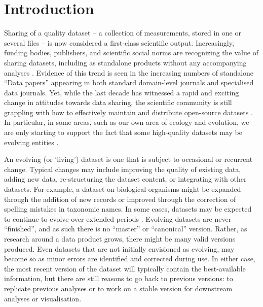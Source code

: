 \documentclass[a4paper,num-refs]{assets/oup-contemporary}
\begin{document}
\newcommand{\smurl}[1]{\href{https://#1}{#1}}
\newcommand{\ghsmurl}[1]{\href{https://github.com/#1}{#1}}

\section{Introduction}

Sharing of a quality dataset -- a collection of measurements, stored in one or several files -- is now considered a first-class scientific output. Increasingly, funding bodies, publishers, and scientific social norms are recognizing the value of sharing datasets, including as standalone products without any accompanying analyses \cite{Whitlock-2011,Fairbairn-2011,Piwowar-2011,VanNoorden-2013,Gibney-2013}. Evidence of this trend is seen in the increasing numbers of standalone ``Data papers'' appearing in both standard domain-level journals and specialised data journals. Yet, while the last decade has witnessed a rapid and exciting change in attitudes towards data sharing, the scientific community is still grappling with how to effectively maintain and distribute open-source datasets \cite{Whitlock-2011, Goodman-2014, Force11-2014, Lowndes-2017, Perkel-2016, VanNoorden-2013, Kratz-2015,Wilkinson-2016, Yenni-2018}. In particular, in some areas, such as our own area of ecology and evolution, we are only starting to support the fact that some high-quality datasets may be evolving entities \cite{Yenni-2018}.

An evolving (or `living') dataset is one that is subject to occasional or recurrent change. Typical changes may include improving the quality of existing data, adding new data, re-structuring the dataset content, or integrating with other datasets. For example, a dataset on biological organisms might be expanded through the addition of new records or improved through the correction of spelling mistakes in taxonomic names. In some cases, datasets may be expected to continue to evolve over extended periods \cite[e.g.][]{Ernest-2018}. Evolving datasets are never ``finished'', and as such there is no ``master'' or ``canonical'' version. Rather, as research around a data product grows, there might be many valid versions produced. Even datasets that are not initially envisioned as evolving, may become so as minor errors are identified and corrected during use. In either case, the most recent version of the dataset will typically contain the best-available information, but there are still reasons to go back to previous versions: to replicate previous analyses or to work on a stable version for downstream analyses or visualisation.  
\end{document}
